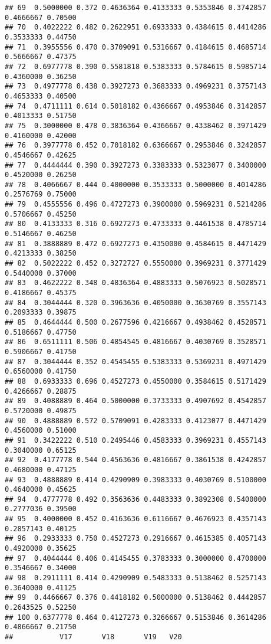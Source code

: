 \documentclass[
]{article}
\begin{document}
\begin{verbatim}
## 69  0.5000000 0.372 0.4636364 0.4133333 0.5353846 0.3742857 0.4666667 0.70500
## 70  0.4022222 0.482 0.2622951 0.6933333 0.4384615 0.4414286 0.3533333 0.44750
## 71  0.3955556 0.470 0.3709091 0.5316667 0.4184615 0.4685714 0.5666667 0.47375
## 72  0.6977778 0.390 0.5581818 0.5383333 0.5784615 0.5985714 0.4360000 0.36250
## 73  0.4977778 0.438 0.3927273 0.3683333 0.4969231 0.3757143 0.4653333 0.40500
## 74  0.4711111 0.614 0.5018182 0.4366667 0.4953846 0.3142857 0.4013333 0.51750
## 75  0.3000000 0.478 0.3836364 0.4366667 0.4338462 0.3971429 0.4160000 0.42000
## 76  0.3977778 0.452 0.7018182 0.6366667 0.2953846 0.3242857 0.4546667 0.42625
## 77  0.4444444 0.390 0.3927273 0.3383333 0.5323077 0.3400000 0.4520000 0.26250
## 78  0.4066667 0.444 0.4000000 0.3533333 0.5000000 0.4014286 0.2576769 0.75000
## 79  0.4555556 0.496 0.4727273 0.3900000 0.5969231 0.5214286 0.5706667 0.45250
## 80  0.4133333 0.316 0.6927273 0.4733333 0.4461538 0.4785714 0.5146667 0.46250
## 81  0.3888889 0.472 0.6927273 0.4350000 0.4584615 0.4471429 0.4213333 0.38250
## 82  0.5022222 0.452 0.3272727 0.5550000 0.3969231 0.3771429 0.5440000 0.37000
## 83  0.4622222 0.348 0.4836364 0.4883333 0.5076923 0.5028571 0.4186667 0.45375
## 84  0.3044444 0.320 0.3963636 0.4050000 0.3630769 0.3557143 0.2093333 0.39875
## 85  0.4644444 0.500 0.2677596 0.4216667 0.4938462 0.4528571 0.5186667 0.47750
## 86  0.6511111 0.506 0.4854545 0.4816667 0.4030769 0.3528571 0.5906667 0.41750
## 87  0.3044444 0.352 0.4545455 0.5383333 0.5369231 0.4971429 0.6560000 0.41750
## 88  0.6933333 0.696 0.4527273 0.4550000 0.3584615 0.5171429 0.4266667 0.28875
## 89  0.4088889 0.464 0.5000000 0.3733333 0.4907692 0.4542857 0.5720000 0.49875
## 90  0.4888889 0.572 0.5709091 0.4283333 0.4123077 0.4471429 0.4560000 0.51000
## 91  0.3422222 0.510 0.2495446 0.4583333 0.3969231 0.4557143 0.3040000 0.65125
## 92  0.4177778 0.544 0.4563636 0.4816667 0.3861538 0.4242857 0.4680000 0.47125
## 93  0.4888889 0.414 0.4290909 0.3983333 0.4030769 0.5100000 0.4640000 0.45625
## 94  0.4777778 0.492 0.3563636 0.4483333 0.3892308 0.5400000 0.2777036 0.39500
## 95  0.4000000 0.452 0.4163636 0.6116667 0.4676923 0.4357143 0.2857143 0.40125
## 96  0.2933333 0.750 0.4527273 0.2916667 0.4615385 0.4057143 0.4920000 0.35625
## 97  0.4044444 0.406 0.4145455 0.3783333 0.3000000 0.4700000 0.3546667 0.34000
## 98  0.2911111 0.414 0.4290909 0.5483333 0.5138462 0.5257143 0.3640000 0.41125
## 99  0.4466667 0.376 0.4418182 0.5000000 0.5138462 0.4442857 0.2643525 0.52250
## 100 0.6377778 0.464 0.4127273 0.3266667 0.5153846 0.3614286 0.4866667 0.21750
##           V17       V18       V19   V20

\end{verbatim}
\end{document}
